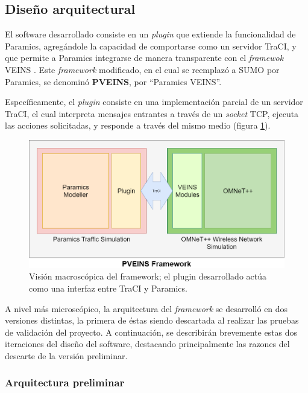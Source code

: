 \subsection{Diseño arquitectural}\label{sec:architecture}

El software desarrollado consiste en un \emph{plugin} que extiende la funcionalidad de Paramics, agregándole la capacidad de comportarse como un servidor TraCI, y que permite a Paramics integrarse de manera transparente con el \emph{framewok} VEINS \autocite{sommer_german_dressler}. Este \emph{framework} modificado, en el cual se reemplazó a SUMO por Paramics, se denominó \textbf{PVEINS}, por ``Paramics VEINS''. 

Específicamente, el \emph{plugin} consiste en una implementación parcial de un servidor TraCI, el cual interpreta mensajes entrantes a través de un \emph{socket} TCP, ejecuta las acciones solicitadas, y responde a través del mismo medio (figura \ref{fig:pveins_genarch}).

\begin{figure}[tpb]
    \centering
    \includegraphics[width=\linewidth]{figuras/PVEINSArch.png}
    \caption[Visión macroscópica del framework]{Visión macroscópica del framework; el plugin desarrollado actúa como una interfaz entre TraCI y Paramics.}
    \label{fig:pveins_genarch}
\end{figure}

A nivel más microscópico, la arquitectura del \emph{framework} se desarrolló en dos versiones distintas, la primera de éstas siendo descartada al realizar las pruebas de validación del proyecto. A continuación, se describirán brevemente estas dos iteraciones del diseño del software, destacando principalmente las razones del descarte de la versión preliminar.

\subsubsection{Arquitectura preliminar}

